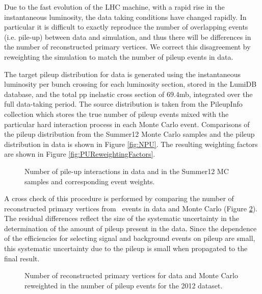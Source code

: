Due to the fast evolution of the LHC machine, with a rapid rise in the
instantaneous luminosity, the data taking conditions have changed
rapidly.  In particular it is difficult to exactly reproduce the
number of overlapping events (i.e. pile-up) between data and
simulation, and thus there will be differences in the number of
reconstructed primary vertices. We correct this disagreement by
reweighting the simulation to match the number of pileup events in data. 

The target pileup distribution for data is generated using the instantaneous luminosity 
per bunch crossing for each luminosity section, stored in the LumiDB database, 
and the total pp inelastic cross section of $69.4$mb, integrated over the 
full data-taking period. 
The source distribution is taken from the PileupInfo
collection which stores the true number of pileup events mixed with the 
particular hard interaction process in each Monte Carlo event. Comparisons of the
pileup distribution from the Summer12 Monte Carlo samples and the pileup 
distribution in data is shown in Figure \ref{fig:NPU}. 
The resulting weighting factors are shown in Figure 
\ref{fig:PUReweightingFactors}. 

\begin{figure}[hbt]
\begin{center}
\caption{\label{fig:PU} \fixme Number of pile-up interactions in data and in the Summer12 MC samples and corresponding event weights.}
\end{center}
\end{figure}

A cross check of this procedure is performed by comparing the number of 
reconstructed primary vertices from \zmm\ events in data and Monte Carlo
(Figure \ref{fig:PUValidation_Full2012}). 
The residual differences 
reflect the size of the systematic uncertainty in the determination 
of the amount of pileup present in the data. Since the dependence 
of the efficiencies for selecting signal and background events on 
pileup are small, this systematic uncertainty due to the pileup 
is small when propagated to the final 
result.

\begin{figure}[hbt]
\begin{center}
\caption{\label{fig:PUValidation_Full2012}{\fixme} Number of reconstructed primary vertices for data and Monte Carlo reweighted in the number 
of pileup events for the 2012 dataset.}
\end{center}
\end{figure}

